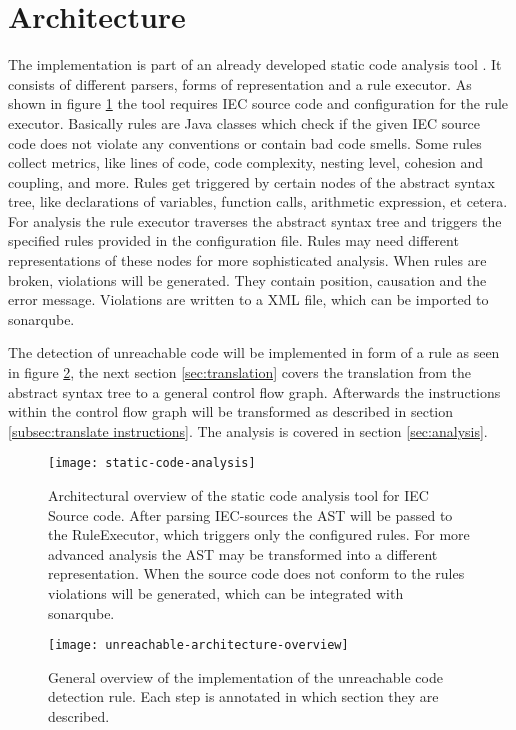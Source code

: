 \section{Architecture}
The implementation is part of an already developed static code analysis tool \cite{Prahofer_2012}. 
It consists of different parsers, forms of representation and a rule executor. 
As shown in figure \ref{fig:general architecture} the tool requires IEC source code and configuration for the rule executor.
Basically rules are Java classes which check if the given IEC source code does not violate any conventions or contain bad code smells. 
Some rules collect metrics, like lines of code, code complexity, nesting level, cohesion and coupling, and more.
Rules get triggered by certain nodes of the abstract syntax tree, like declarations of variables, function calls, arithmetic expression, et cetera.
For analysis the rule executor traverses the abstract syntax tree and triggers the specified rules provided in the configuration file.
Rules may need different representations of these nodes for more sophisticated analysis. 
When rules are broken, violations will be generated. They contain position, causation and the error message. Violations are written to a XML file, which can be imported to sonarqube\cite{sonarqube}.


The detection of unreachable code will be implemented in form of a rule as seen in figure \ref{fig:unreachable-architecture-overview}, the next section \ref{sec:translation} covers the translation from the abstract syntax tree to a general control flow graph. 
Afterwards the instructions within the control flow graph will be transformed as described in section \ref{subsec:translate instructions}.
The analysis is covered in section \ref{sec:analysis}.

\begin{figure}[h!]
	\centering
	\texttt{[image: static-code-analysis]}
	\caption{Architectural overview of the static code analysis tool for IEC Source code. After parsing IEC-sources the AST will be passed to the RuleExecutor, which triggers only the configured rules. For more advanced analysis the AST may be transformed into a different representation. When the source code does not conform to the rules violations will be generated, which can be integrated with sonarqube.}
	\label{fig:general architecture}
\end{figure}

\begin{figure}[h!]
	\centering
	\texttt{[image: unreachable-architecture-overview]}
	\caption{General overview of the implementation of the unreachable code detection rule. Each step is annotated in which section they are described. }
	\label{fig:unreachable-architecture-overview}
\end{figure}

